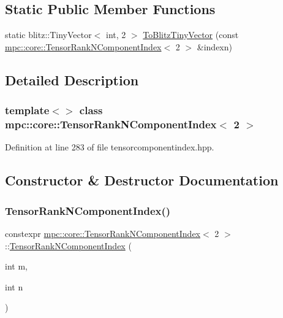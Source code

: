 \subsection*{Static Public Member Functions}
\begin{DoxyCompactItemize}
\item 
static blitz\+::\+Tiny\+Vector$<$ int, 2 $>$ \mbox{\hyperlink{classmpc_1_1core_1_1_tensor_rank_n_component_index_3_012_01_4_a4de4ca14032dfc36db2289015bdf87d6}{To\+Blitz\+Tiny\+Vector}} (const \mbox{\hyperlink{classmpc_1_1core_1_1_tensor_rank_n_component_index}{mpc\+::core\+::\+Tensor\+Rank\+N\+Component\+Index}}$<$ 2 $>$ \&indexn)
\end{DoxyCompactItemize}


\subsection{Detailed Description}
\subsubsection*{template$<$$>$\newline
class mpc\+::core\+::\+Tensor\+Rank\+N\+Component\+Index$<$ 2 $>$}



Definition at line 283 of file tensorcomponentindex.\+hpp.



\subsection{Constructor \& Destructor Documentation}
\mbox{\label{classmpc_1_1core_1_1_tensor_rank_n_component_index_3_012_01_4_aea9ecace40b5b929c8aea1eadcbf61a4}} 
\subsubsection{\texorpdfstring{Tensor\+Rank\+N\+Component\+Index()}{TensorRankNComponentIndex()}\hspace{0.1cm}{\footnotesize\ttfamily [1/2]}}
{\footnotesize\ttfamily constexpr \mbox{\hyperlink{classmpc_1_1core_1_1_tensor_rank_n_component_index}{mpc\+::core\+::\+Tensor\+Rank\+N\+Component\+Index}}$<$ 2 $>$\+::\mbox{\hyperlink{classmpc_1_1core_1_1_tensor_rank_n_component_index}{Tensor\+Rank\+N\+Component\+Index}} (\begin{DoxyParamCaption}\item[{int}]{m,  }\item[{int}]{n }\end{DoxyParamCaption})\hspace{0.3cm}{\ttfamily [inline]}}



